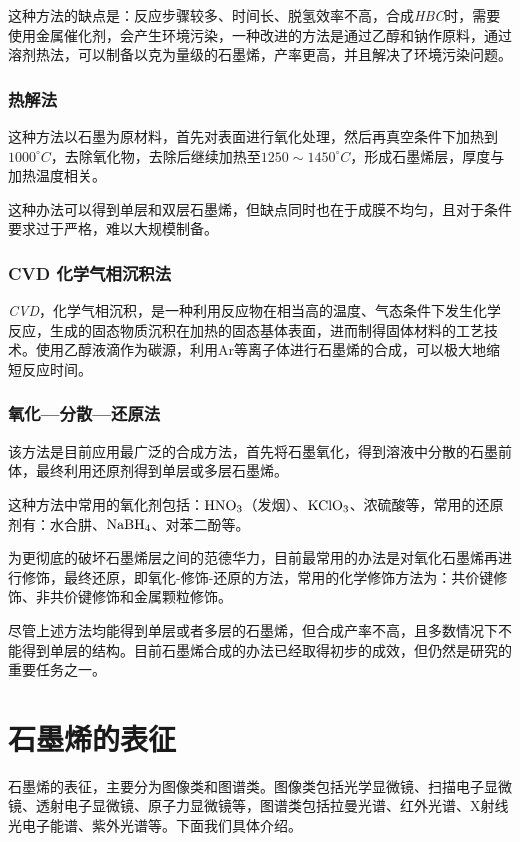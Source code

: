 这种方法的缺点是：反应步骤较多、时间长、脱氢效率不高，合成\textit{HBC}时，需要使用金属催化剂，会产生环境污染，一种改进的方法是通过乙醇和钠作原料，通过溶剂热法，可以制备以克为量级的石墨烯，产率更高，并且解决了环境污染问题。

\subsubsection{热解法}

这种方法以石墨为原材料，首先对表面进行氧化处理，然后再真空条件下加热到$1000^\circ C$，去除氧化物，去除后继续加热至$1250\sim 1450^\circ C$，形成石墨烯层，厚度与加热温度相关。

这种办法可以得到单层和双层石墨烯，但缺点同时也在于成膜不均匀，且对于条件要求过于严格，难以大规模制备。

\subsubsection{CVD 化学气相沉积法}

\textit{CVD}，化学气相沉积，是一种利用反应物在相当高的温度、气态条件下发生化学反应，生成的固态物质沉积在加热的固态基体表面，进而制得固体材料的工艺技术。使用乙醇液滴作为碳源，利用Ar等离子体进行石墨烯的合成，可以极大地缩短反应时间。

\subsubsection{氧化—分散—还原法}

该方法是目前应用最广泛的合成方法，首先将石墨氧化，得到溶液中分散的石墨前体，最终利用还原剂得到单层或多层石墨烯。

这种方法中常用的氧化剂包括：$\ce{HNO_3}$（发烟）、$\ce{KClO_3}$、浓硫酸等，常用的还原剂有：水合肼、$\ce{NaBH_4}$、对苯二酚等。

为更彻底的破坏石墨烯层之间的范德华力，目前最常用的办法是对氧化石墨烯再进行修饰，最终还原，即氧化-修饰-还原的方法，常用的化学修饰方法为：共价键修饰、非共价键修饰和金属颗粒修饰。

尽管上述方法均能得到单层或者多层的石墨烯，但合成产率不高，且多数情况下不能得到单层的结构。目前石墨烯合成的办法已经取得初步的成效，但仍然是研究的重要任务之一。


\section{石墨烯的表征}

石墨烯的表征，主要分为图像类和图谱类\cite{RN11}。图像类包括光学显微镜、扫描电子显微镜、透射电子显微镜、原子力显微镜等，图谱类包括拉曼光谱、红外光谱、X射线光电子能谱、紫外光谱等。下面我们具体介绍。

